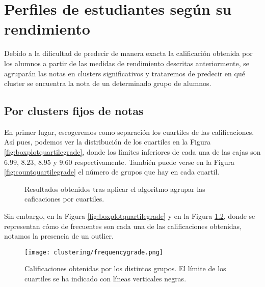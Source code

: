 \chapter{Perfiles de estudiantes según su rendimiento}

Debido a la dificultad de predecir de manera exacta la calificación obtenida por los alumnos a partir de las medidas de rendimiento descritas anteriormente, se agruparán las notas en clusters significativos y trataremos de predecir en qué cluster se encuentra la nota de un determinado grupo de alumnos.

\section{Por clusters fijos de notas}

En primer lugar, escogeremos como separación los cuartiles de las calificaciones. Así pues, podemos ver la distribución de los cuartiles en la Figura \ref{fig:boxplotquartilegrade}, donde los límites inferiores de cada una de las cajas son $6.99$, $8.23$, $8.95$ y $9.60$ respectivamente. También puede verse en la Figura \ref{fig:countquartilegrade} el número de grupos que hay en cada cuartil.


\begin{figure}[H]
\centering
{}\qquad
{}%
\caption{Resultados obtenidos tras aplicar el algoritmo agrupar las caficaciones por cuartiles.}
\label{fig:quartilegradeclustering}
\end{figure}

Sin embargo, en la Figura \ref{fig:boxplotquartilegrade} y en la Figura \ref{fig:frequenciesgrade}, donde se representan cómo de frecuentes son cada una de las calificaciones obtenidas, notamos la presencia de un outlier.

\begin{figure}[H]
    \centering
    \texttt{[image: clustering/frequencygrade.png]}
    \caption{Calificaciones obtenidas por los distintos grupos. El límite de los cuartiles se ha indicado con líneas verticales negras.}
    \label{fig:frequenciesgrade}
\end{figure}

